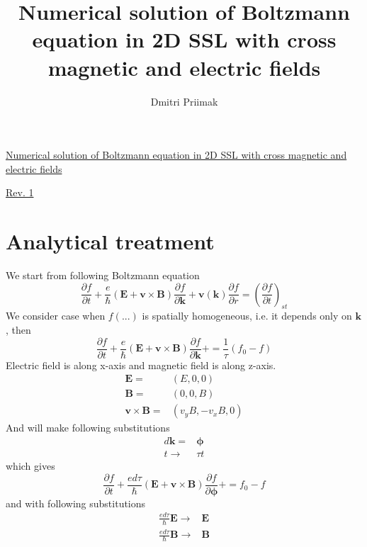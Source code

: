 \documentclass[40pt,letterpaper]{article}
\author{Dmitri Priimak}
\title{Numerical solution of Boltzmann equation in 2D SSL with cross magnetic and electric fields}
\begin{document}
 \begin{center}
  \underline{Numerical solution of Boltzmann equation in 2D SSL with cross magnetic and electric fields}
 \end{center}
  \begin{center}
    \underline{Rev. 1}
  \end{center}
  \section{Analytical treatment}
    We start from following Boltzmann equation
    \begin{equation}\label{eq:boltzmann}
     \frac{\partial f}{\partial t}+
     \frac{e}{\hbar}\left ( \mathbf{E} + \mathbf{v}\times\mathbf{B} \right ) \frac{\partial f}{\partial\mathbf{k}}+
     \mathbf{v}(\mathbf{k})\frac{\partial f}{\partial r} = \left ( \frac{\partial f}{\partial t} \right )_{st}
    \end{equation}
    We consider case when $f(...)$ is spatially homogeneous, i.e. it depends only on $\mathbf{k}$, then
    \begin{equation}\label{eq:boltzmann_homo}
     \frac{\partial f}{\partial t}+
     \frac{e}{\hbar}\left ( \mathbf{E} + \mathbf{v}\times\mathbf{B} \right ) \frac{\partial f}{\partial\mathbf{k}}+
     = \frac{1}{\tau}\left ( f_0 - f \right )
    \end{equation}
    Electric field is along x-axis and magnetic field is along z-axis.
    \begin{align}
     \mathbf{E}=&(E,0,0) \\
     \mathbf{B}=&(0,0,B) \\
     \mathbf{v}\times\mathbf{B}=&(v_y B, -v_x B, 0)
    \end{align}
    And will make following substitutions
    \begin{align}
     d\mathbf{k}=&\mathbf{\phi} \\
     t \to & \tau t
    \end{align}
    which gives
    \begin{equation}
     \frac{\partial f}{\partial t}+
     \frac{ed\tau}{\hbar}\left ( \mathbf{E} + \mathbf{v}\times\mathbf{B} \right ) \frac{\partial f}{\partial\mathbf{\phi}}+
     = f_0 - f
    \end{equation}
    and with following substitutions
    \begin{align}
     \frac{ed\tau}{\hbar}\mathbf{E}\to & \mathbf{E} \\     
     \frac{ed\tau}{\hbar}\mathbf{B}\to & \mathbf{B}
    \end{align}
\end{document}
